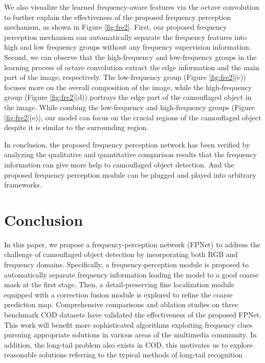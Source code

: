 \documentclass[sigconf,screen]{acmart}
\begin{document}
We also visualize the learned frequency-aware features via the octave convolution to further explain the effectiveness of the proposed frequency perception mechanism, as shown in Figure \ref{fig:fre2}. 
First, our proposed frequency perception mechanism can automatically separate the frequency features into high and low frequency groups without any frequency supervision information.
Second, we can observe that the high-frequency and low-frequency groups in the learning process of octave convolution extract the edge information and the main part of the image, respectively. 
The low-frequency group (Figure \ref{fig:fre2}(c)) focuses more on the overall composition of the image, while the high-frequency group (Figure \ref{fig:fre2}(d)) portrays the edge part of the camouflaged object in the image.
While combing the low-frequency and high-frequency groups (Figure \ref{fig:fre2}(e)), our model can focus on the crucial regions of the camouflaged object despite it is similar to the surrounding region. 

In conclusion, the proposed frequency perception network has been verified by analyzing the qualitative and quantitative comparison results that the frequency information can give more help to camouflaged object detection. And the proposed frequency perception module can be plugged and played into arbitrary frameworks.




\section{Conclusion}
In this paper, we propose a frequency-perception network (FPNet) to address the challenge of camouflaged object detection by incorporating both RGB and frequency domains. Specifically, a frequency-perception module is proposed to automatically separate frequency information leading the model to a good coarse mask at the first stage. Then, a detail-preserving fine localization module equipped with a correction fusion module is explored to refine the coarse prediction map. Comprehensive comparisons and ablation studies on three benchmark COD datasets have validated the effectiveness of the proposed FPNet. 
This work will benefit more sophisticated algorithms exploiting frequency clues pursuing appropriate solutions in various areas of the multimedia community. In addition, the long-tail problem also exists in COD, this motivates us to explore reasonable solutions referring to the typical methods of long-tail recognition \cite{yang2021learning, yang2022optimizing}.
\end{document}
